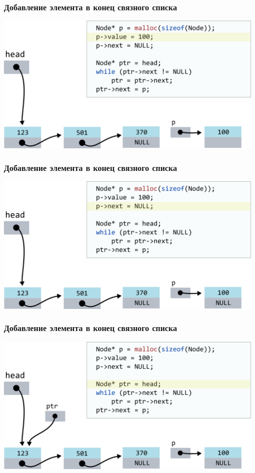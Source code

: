 \documentclass[10pt,pdf,hyperref={unicode}]{beamer}
\begin{document}
\begin{frame}[fragile]
\frametitle{Добавление элемента в конец связного списка}
\begin{center}
\includegraphics[width=\imageSizeMult\linewidth]{../images/codelist/codelistf_insert3.png}
\end{center}
\end{frame}



\begin{frame}[fragile]
\frametitle{Добавление элемента в конец связного списка}
\begin{center}
\includegraphics[width=\imageSizeMult\linewidth]{../images/codelist/codelistf_insert4.png}
\end{center}
\end{frame}



\begin{frame}[fragile]
\frametitle{Добавление элемента в конец связного списка}
\begin{center}
\includegraphics[width=\imageSizeMult\linewidth]{../images/codelist/codelistf_insert5.png}
\end{center}
\end{frame}
\end{document}

